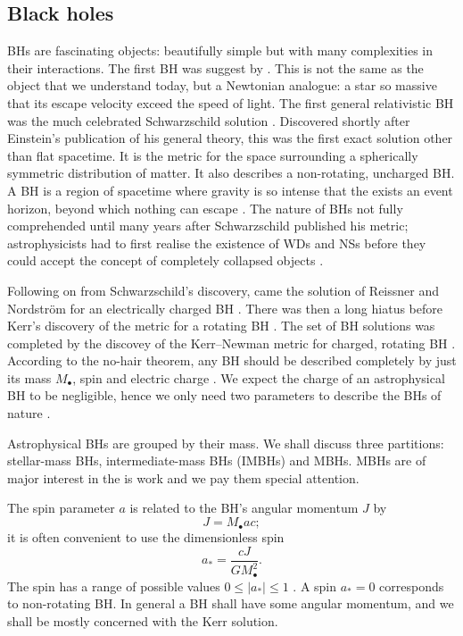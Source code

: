 \subsection{Black holes}

BHs are fascinating objects: beautifully simple but with many complexities in their interactions. The first BH was suggest by \citet{Michell1784}. This is not the same as the object that we understand today, but a Newtonian analogue: a star so massive that its escape velocity exceed the speed of light. The first general relativistic BH was the much celebrated Schwarzschild solution \citep{Schwarzschild1916}. Discovered shortly after Einstein's publication of his general theory, this was the first exact solution other than flat spacetime. It is the metric for the space surrounding a spherically symmetric distribution of matter. It also describes a non-rotating, uncharged BH. A BH is a region of spacetime where gravity is so intense that the exists an event horizon, beyond which nothing can escape \citep[section 33.1]{Misner1973}. The nature of BHs not fully comprehended until many years after Schwarzschild published his metric; astrophysicists had to first realise the existence of WDs and NSs before they could accept the concept of completely collapsed objects \citep{Israel1987}.

Following on from Schwarzschild's discovery, came the solution of Reissner and Nordstr{\"o}m for an electrically charged BH \citep{Reissner1916,Nordstrom1918}. There was then a long hiatus before Kerr's discovery of the metric for a rotating BH \citep{Kerr1963}. The set of BH solutions was completed by the discovey of the Kerr--Newman metric for charged, rotating BH \citep{Newman1965}. According to the no-hair theorem, any BH should be described completely by just its mass $M_\bullet$, spin and electric charge \citep{Israel1967, Israel1968, Carter1971, Hawking1972, Robinson1975}. We expect the charge of an astrophysical BH to be negligible, hence we only need two parameters to describe the BHs of nature \citep[sections 36 and 51]{Chandrasekhar1992}.

Astrophysical BHs are grouped by their mass. We shall discuss three partitions: stellar-mass BHs, intermediate-mass BHs (IMBHs) and MBHs. MBHs are of major interest in the is work and we pay them special attention.

The spin parameter $a$ is related to the BH's angular momentum $J$ by
\begin{equation}
J = M_\bullet ac;
\end{equation}
it is often convenient to use the dimensionless spin
\begin{equation}
a_\ast = \frac{cJ}{GM_\bullet^2}.
\end{equation}
The spin has a range of possible values $0 \leq |a_\ast| \leq 1$ \cite[section 66]{Chandrasekhar1992}. A spin $a_\ast = 0$ corresponds to non-rotating BH. In general a BH shall have some angular momentum, and we shall be mostly concerned with the Kerr solution.

